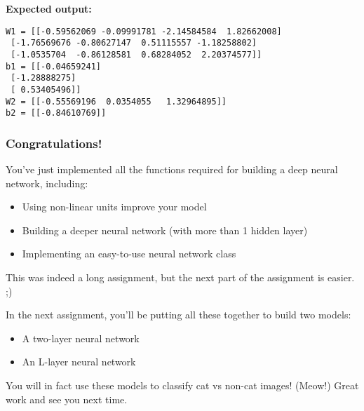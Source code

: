 \documentclass[11pt]{article}
\providecommand{\tightlist}{%
      \setlength{\itemsep}{0pt}\setlength{\parskip}{0pt}}
\begin{document}
    \textbf{Expected output:}

\begin{verbatim}
W1 = [[-0.59562069 -0.09991781 -2.14584584  1.82662008]
 [-1.76569676 -0.80627147  0.51115557 -1.18258802]
 [-1.0535704  -0.86128581  0.68284052  2.20374577]]
b1 = [[-0.04659241]
 [-1.28888275]
 [ 0.53405496]]
W2 = [[-0.55569196  0.0354055   1.32964895]]
b2 = [[-0.84610769]]
\end{verbatim}

    \hypertarget{congratulations}{%
\subsubsection{Congratulations!}\label{congratulations}}

You've just implemented all the functions required for building a deep
neural network, including:

\begin{itemize}
\tightlist
\item
  Using non-linear units improve your model
\item
  Building a deeper neural network (with more than 1 hidden layer)
\item
  Implementing an easy-to-use neural network class
\end{itemize}

This was indeed a long assignment, but the next part of the assignment
is easier. ;)

In the next assignment, you'll be putting all these together to build
two models:

\begin{itemize}
\tightlist
\item
  A two-layer neural network
\item
  An L-layer neural network
\end{itemize}

You will in fact use these models to classify cat vs non-cat images!
(Meow!) Great work and see you next time.


    
    
    
\end{document}
